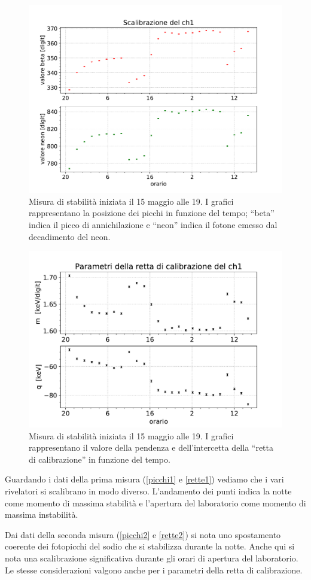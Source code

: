 \begin{figure}[h]
\centering
\includegraphics[width=28 em]{immagini/0515_picchi}
\caption{Misura di stabilità iniziata il 15 maggio alle 19. I grafici rappresentano la posizione dei picchi in funzione del tempo; ``beta'' indica il picco di annichilazione e ``neon'' indica il fotone emesso dal decadimento del neon.}
\label{picchi2}
\end{figure}

\begin{figure}[h]
\centering
\includegraphics[width=27 em]{immagini/0515_rette}
\caption{Misura di stabilità iniziata il 15 maggio alle 19. I grafici rappresentano il valore della pendenza e dell'intercetta della ``retta di calibrazione'' in funzione del tempo.}
\label{rette2}
\end{figure}

Guardando i dati della prima misura (\autoref{picchi1} e \autoref{rette1}) vediamo che i vari rivelatori si scalibrano in modo diverso. L'andamento dei punti indica la notte come momento di massima stabilità e l'apertura del laboratorio come momento di massima instabilità.

Dai dati della seconda misura (\autoref{picchi2} e \autoref{rette2}) si nota uno spostamento coerente dei fotopicchi del sodio che si stabilizza durante la notte. Anche qui si nota una scalibrazione significativa durante gli orari di apertura del laboratorio.
Le stesse considerazioni valgono anche per i parametri della retta di calibrazione.